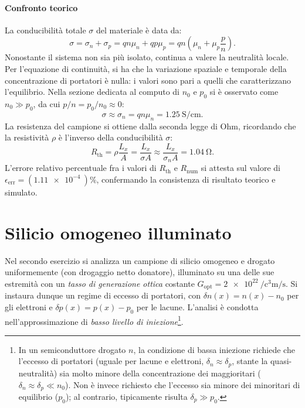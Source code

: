 \documentclass[a4paper,11pt]{report}
\begin{document}
\subsubsection{Confronto teorico}
La conducibilità totale $\sigma$ del materiale è data da:
\begin{equation}
\sigma = \sigma_n + \sigma_p = qn\mu_n + qp\mu_p = qn\left(\mu_n + \mu_p\frac{p}{n}\right).
\end{equation}
Nonostante il sistema non sia più isolato, continua a valere la neutralità locale. Per l'equazione di continuità, si ha che la variazione spaziale e temporale della concentrazione di portatori è nulla: i valori sono pari a quelli che caratterizzano l'equilibrio. Nella sezione dedicata al computo di $n_0$ e $p_0$ si è osservato come $n_0 \gg p_0$, da cui $p/n = p_0/n_0 \approx 0$:
\begin{equation}
\sigma \approx \sigma_n = qn\mu_n = \SI{1.25}{\siemens\per\centi\meter}.
\end{equation}
La resistenza del campione si ottiene dalla seconda legge di Ohm, ricordando che la resistività $\rho$ è l'inverso della conducibilità $\sigma$:
\begin{equation}
R_{\text{th}} = \rho \frac{L_x}{A} = \frac{L_x}{\sigma A} \approx \frac{L_x}{\sigma_n A} = \SI{1.04}{\ohm}.
\end{equation}
L'errore relativo percentuale fra i valori di $R_{\text{th}}$ e $R_{\text{num}}$ si attesta sul valore di $\epsilon_{\text{err}} = (\SI{1.11e-4}{})\%$, confermando la consistenza di risultato teorico e simulato. 


\chapter{Silicio omogeneo illuminato}
Nel secondo esercizio si analizza un campione di silicio omogeneo e drogato uniformemente (con drogaggio netto donatore), illuminato su una delle sue estremità con un \textit{tasso di generazione ottica} costante $G_{\text{opt}} = \SI{2e22} {\per\cubic\centi\meter\per\second}$. Si instaura dunque un regime di eccesso di portatori, con $\delta n (x)= n(x)-n_0$ per gli elettroni e $\delta p(x) = p(x)-p_0$ per le lacune. L'analisi è condotta nell'approssimazione di \textit{basso livello di iniezione}\footnote{In un semiconduttore drogato $n$, la condizione di bassa iniezione richiede che l'eccesso di portatori (uguale per lacune e elettroni, $\delta_n \approx \delta_p$, stante la quasi-neutralità) sia molto minore della concentrazione dei maggioritari ($\delta_n \approx \delta_p \ll n_0$). Non è invece richiesto che l'eccesso sia minore dei minoritari di equilibrio ($p_0$); al contrario, tipicamente risulta $\delta_p \gg p_0$.}.
\end{document}

